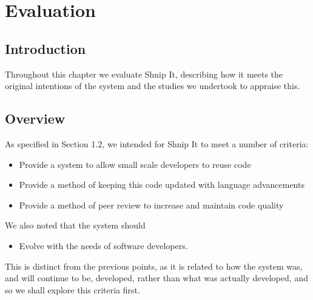 \chapter{Evaluation}

\section{Introduction}
Throughout this chapter we evaluate Shnip It, describing how it meets the original intentions of the system and the studies we undertook to appraise this.

\section{Overview}
As specified in Section 1.2, we intended for Shnip It to meet a number of criteria:

\begin{itemize}
\item Provide a system to allow small scale developers to reuse code
\item Provide a method of keeping this code updated with language advancements
\item Provide a method of peer review to increase and maintain code quality
\end{itemize}

We also noted that the system should 
\begin{itemize}
\item Evolve with the needs of software developers. 
\end{itemize}
This is distinct from the previous points, as it is related to how the system was, and will continue to be, developed, rather than what was actually developed, and so we shall explore this criteria first.

